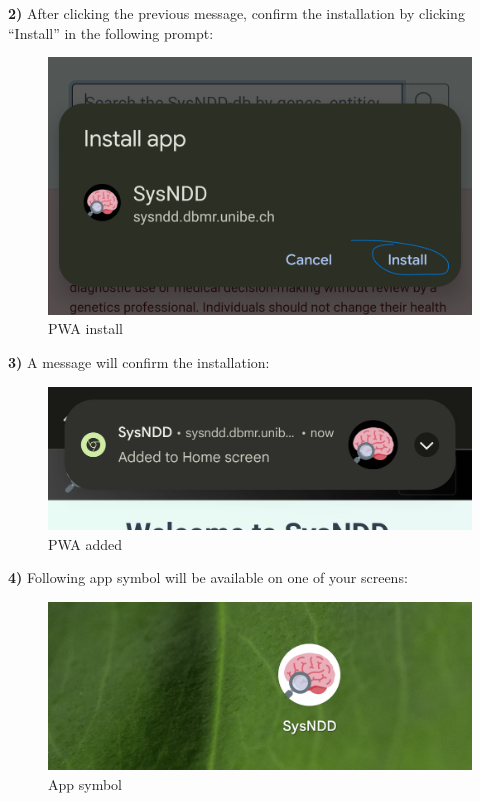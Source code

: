 \documentclass[
]{article}
\begin{document}
\textbf{2)} After clicking the previous message, confirm the installation by clicking ``Install'' in the following prompt:

\begin{figure}
\centering
\includegraphics{./static/img/02_25-PWA-install-b.png}
\caption{PWA install}
\end{figure}

\textbf{3)} A message will confirm the installation:

\begin{figure}
\centering
\includegraphics{./static/img/02_26-PWA-install-c.png}
\caption{PWA added}
\end{figure}

\textbf{4)} Following app symbol will be available on one of your screens:

\begin{figure}
\centering
\includegraphics{./static/img/02_27-PWA-install-d.png}
\caption{App symbol}
\end{figure}
\end{document}
